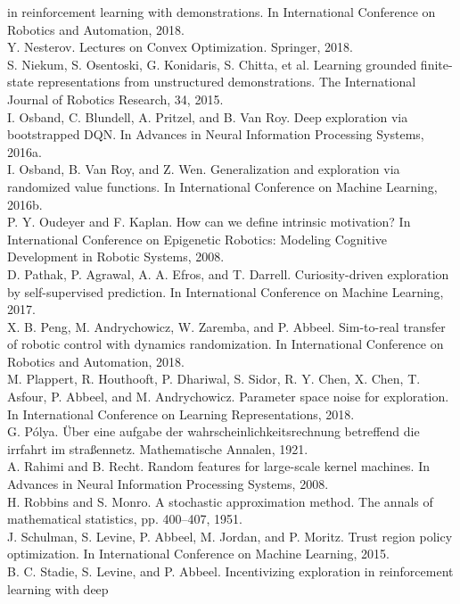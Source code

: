 \documentclass{article}
\newcounter{n}
\begin{document}
in reinforcement learning with demonstrations. In International Conference on Robotics and
Automation, 2018.\\
Y. Nesterov. Lectures on Convex Optimization. Springer, 2018.\\
S. Niekum, S. Osentoski, G. Konidaris, S. Chitta, et al. Learning grounded finite-state representations
from unstructured demonstrations. The International Journal of Robotics Research, 34, 2015.\\
I. Osband, C. Blundell, A. Pritzel, and B. Van Roy. Deep exploration via bootstrapped DQN. In
Advances in Neural Information Processing Systems, 2016a.\\
I. Osband, B. Van Roy, and Z. Wen. Generalization and exploration via randomized value functions.
In International Conference on Machine Learning, 2016b.\\
P. Y. Oudeyer and F. Kaplan. How can we define intrinsic motivation? In International Conference
on Epigenetic Robotics: Modeling Cognitive Development in Robotic Systems, 2008.\\
D. Pathak, P. Agrawal, A. A. Efros, and T. Darrell. Curiosity-driven exploration by self-supervised
prediction. In International Conference on Machine Learning, 2017.\\
X. B. Peng, M. Andrychowicz, W. Zaremba, and P. Abbeel. Sim-to-real transfer of robotic control
with dynamics randomization. In International Conference on Robotics and Automation, 2018.
\\
M. Plappert, R. Houthooft, P. Dhariwal, S. Sidor, R. Y. Chen, X. Chen, T. Asfour, P. Abbeel, and
M. Andrychowicz. Parameter space noise for exploration. In International Conference on Learning
Representations, 2018.\\
G. Pólya. Über eine aufgabe der wahrscheinlichkeitsrechnung betreffend die irrfahrt im straßennetz.
Mathematische Annalen, 1921.\\
A. Rahimi and B. Recht. Random features for large-scale kernel machines. In Advances in Neural
Information Processing Systems, 2008.\\
H. Robbins and S. Monro. A stochastic approximation method. The annals of mathematical statistics,
pp. 400–407, 1951.\\
J. Schulman, S. Levine, P. Abbeel, M. Jordan, and P. Moritz. Trust region policy optimization. In
International Conference on Machine Learning, 2015.\\
B. C. Stadie, S. Levine, and P. Abbeel. Incentivizing exploration in reinforcement learning with deep
\end{document}
